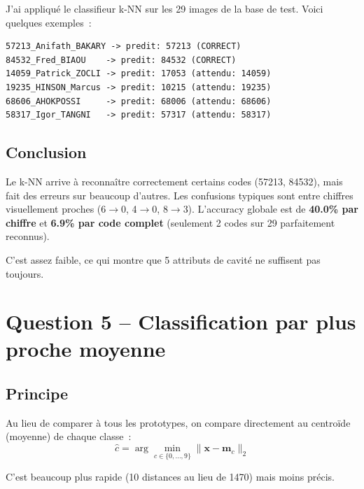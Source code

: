\documentclass[a4paper,11pt]{article}
\begin{document}
J'ai appliqué le classifieur k-NN sur les 29 images de la base de test. Voici quelques exemples~:

\begin{lstlisting}[style=output, caption={Exemples de résultats k-NN.}]
57213_Anifath_BAKARY -> predit: 57213 (CORRECT)
84532_Fred_BIAOU    -> predit: 84532 (CORRECT)
14059_Patrick_ZOCLI -> predit: 17053 (attendu: 14059)
19235_HINSON_Marcus -> predit: 10215 (attendu: 19235)
68606_AHOKPOSSI     -> predit: 68006 (attendu: 68606)
58317_Igor_TANGNI   -> predit: 57317 (attendu: 58317)
\end{lstlisting}


\subsection{Conclusion}

Le k-NN arrive à reconnaître correctement certains codes (57213, 84532), mais fait des erreurs sur beaucoup d'autres. Les confusions typiques sont entre chiffres visuellement proches (6$\to$0, 4$\to$0, 8$\to$3). L'accuracy globale est de \textbf{40.0\% par chiffre} et \textbf{6.9\% par code complet} (seulement 2 codes sur 29 parfaitement reconnus).

C'est assez faible, ce qui montre que 5 attributs de cavité ne suffisent pas toujours.

\section{Question 5 -- Classification par plus proche moyenne}

\subsection{Principe}

Au lieu de comparer à tous les prototypes, on compare directement au centroïde (moyenne) de chaque classe~:
\[
\hat{c} = \arg\min_{c \in \{0,...,9\}} \|\mathbf{x} - \mathbf{m}_c\|_2
\]

C'est beaucoup plus rapide (10 distances au lieu de 1470) mais moins précis.
\end{document}
